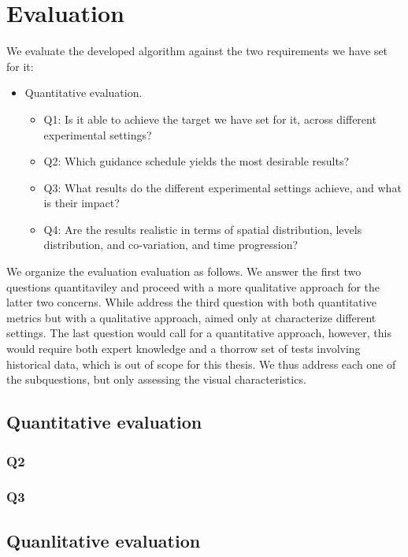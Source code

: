 \chapter{Evaluation}\label{ch:eval}

We evaluate the developed algorithm against the two requirements we have set for it: 
\begin{itemize}
    \item Quantitative evaluation.
    \begin{itemize}
        \item Q1: Is it able to achieve the target we have set for it, across different experimental settings?
        \item Q2: Which guidance schedule yields the most desirable results?
    \end{itemize}
    \begin{itemize}
        \item Q3: What results do the different experimental settings achieve, and what is their impact?
        \item Q4: Are the results realistic in terms of spatial distribution, levels distribution, and co-variation, and time progression? 
    \end{itemize}
\end{itemize}

We organize the evaluation evaluation as follows.
We answer the first two questions quantitaviley and proceed with a more qualitative approach for the latter two concerns.
While address the third question with both quantitative metrics but with a qualitative approach, aimed only at characterize different settings. 
The last question would call for a quantitative approach, however, this would require both expert knowledge and a thorrow set of tests involving historical data, which is out of scope for this thesis.
We thus address each one of the subquestions, but only assessing the visual characteristics.

\section{Quantitative evaluation}
\subsection{Q2}
\subsection{Q3}
\section{Quanlitative evaluation}
